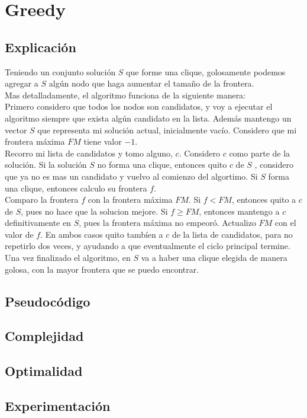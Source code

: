 
\section{Greedy}

\subsection{Explicación}
Teniendo un conjunto solución $S$ que forme una clique, golosamente podemos agregar a $S$ algún nodo que haga aumentar el tamaño de la frontera. \\

Mas detalladamente, el algoritmo funciona de la siguiente manera: \\

Primero considero que todos los nodos son candidatos, y voy a ejecutar el algoritmo siempre que exista algún candidato en la lista. Además mantengo un vector $S$ que representa mi solución actual, inicialmente vacío. Considero que mi frontera máxima $FM$ tiene valor $-1$. \\

Recorro mi lista de candidatos y tomo alguno, $c$. Considero $c$ como parte de la solución. Si la solución $S$ no forma una clique, entonces quito $c$ de $S$ , considero que ya no es mas un candidato y vuelvo al comienzo del algortimo. Si $S$ forma una clique, entonces calculo su frontera $f$. \\

Comparo la frontera $f$ con la frontera máxima $FM$. Si $f < FM$, entonces quito a $c$ de $S$, pues no hace que la solucion mejore. Si $f \geq FM$, entonces mantengo a $c$ definitivamente en $S$, pues la frontera máxima no empeoró. Actualizo $FM$ con el valor de $f$. En ambos casos quito tambíen a $c$ de la lista de candidatos, para no repetirlo dos veces, y ayudando a que eventualmente el ciclo principal termine. \\

Una vez finalizado el algoritmo, en $S$ va a haber una clique elegida de manera golosa, con la mayor frontera que se puedo encontrar. \\


\subsection{Pseudocódigo}

\subsection{Complejidad}

\subsection{Optimalidad}

\subsection{Experimentación}
